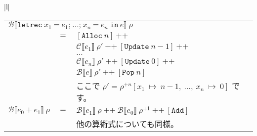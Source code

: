 \documentclass{jarticle}
\begin{document}
\begin{tabular} {|l|}
\begin{tabular}{r c l}
		\multicolumn{3}{l}{$\mathcal{B} \llbracket \texttt{letrec} ~ x_1 ~ \texttt{=} ~ e_1\texttt{;} ~  \ldots \texttt{;} ~ x_n ~ \texttt{=} ~ e_n ~ \texttt{in} ~ e \rrbracket ~ \rho$}                                                                                             \\
		                                                                         & $=$ & $\left[\texttt{Alloc} ~ n\right] ~ \texttt{++}$                                                                                                                                              \\
		                                                                         &     & $\mathcal{C} \llbracket e_1 \rrbracket ~ \rho' ~ \texttt{++} ~ \left[\texttt{Update} ~ n - 1\right] ~ \texttt{++}$                                                                           \\
		                                                                         &     & $\ldots$                                                                                                                                                                                     \\
		                                                                         &     & $\mathcal{C} \llbracket e_n \rrbracket ~ \rho' ~ \texttt{++} ~ \left[\texttt{Update} ~ 0\right] ~ \texttt{++}$                                                                               \\
		                                                                         &     & $\mathcal{B} \llbracket e \rrbracket ~ \rho' ~ \texttt{++} ~ \left[\texttt{Pop} ~ n\right]$                                                                                                  \\
		                                                                         &     & ここで $\rho' = \rho^{+n} \left[x_1 ~ \mapsto ~ n - 1, ~ \ldots , ~ x_n ~ \mapsto ~ 0\right]$ です。                                                                                         \\
		$\mathcal{B} \llbracket e_0 ~ \texttt{+} ~ e_1 \rrbracket ~ \rho$        & $=$ & $\mathcal{B} \llbracket e_1 \rrbracket ~ \rho ~ \texttt{++} ~ \mathcal{B} \llbracket e_0 \rrbracket ~ \rho^{+1} ~ \texttt{++} ~ \left[\texttt{Add} \right]$                                  \\
		                                                                         &     & 他の算術式についても同様。                                                                                                                                                                   \\

\end{tabular}
\end{tabular}
\end{document}
